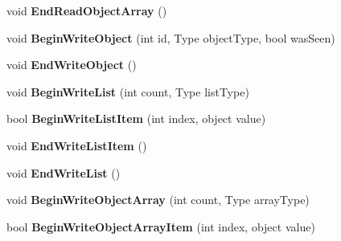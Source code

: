 \begin{DoxyCompactItemize}
\mbox{\label{interface_serialization_1_1_i_storage_adcb0b93e93558a3ae5453c36bb04d8ff}} 
void {\bfseries End\+Read\+Object\+Array} ()
\item 
\mbox{\label{interface_serialization_1_1_i_storage_a3fb97eb3491469373d49dfa190c66dd4}} 
void {\bfseries Begin\+Write\+Object} (int id, Type object\+Type, bool was\+Seen)
\item 
\mbox{\label{interface_serialization_1_1_i_storage_a6e6a7469ad14b39e46cd746d4bf3d2ca}} 
void {\bfseries End\+Write\+Object} ()
\item 
\mbox{\label{interface_serialization_1_1_i_storage_afaa8cb1cee211688a43655b1f503ca12}} 
void {\bfseries Begin\+Write\+List} (int count, Type list\+Type)
\item 
\mbox{\label{interface_serialization_1_1_i_storage_a1f2891613afdde349dd1bede1187af08}} 
bool {\bfseries Begin\+Write\+List\+Item} (int index, object value)
\item 
\mbox{\label{interface_serialization_1_1_i_storage_a996ec10cec9f039c84f059ab511dce31}} 
void {\bfseries End\+Write\+List\+Item} ()
\item 
\mbox{\label{interface_serialization_1_1_i_storage_a1698725786d0d7d7360a8ead45ebe3ea}} 
void {\bfseries End\+Write\+List} ()
\item 
\mbox{\label{interface_serialization_1_1_i_storage_afc5be795dc2ef9b4fc64abbd764ac7e5}} 
void {\bfseries Begin\+Write\+Object\+Array} (int count, Type array\+Type)
\item 
\mbox{\label{interface_serialization_1_1_i_storage_a22a9b9ce868724387a5fe655089c08a7}} 
bool {\bfseries Begin\+Write\+Object\+Array\+Item} (int index, object value)
\item 
\mbox{\label{interface_serialization_1_1_i_storage_a0cde5cf5cf0ba7a6a229213330619a49}} 

\end{DoxyCompactItemize}
